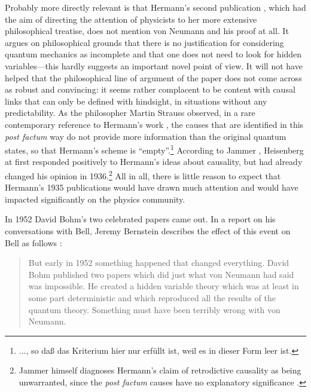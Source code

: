 \documentclass[11pt]{article}
\begin{document}
Probably more directly relevant is that Hermann's second publication \cite{hermann2}, which had the aim of directing the attention of physicists to her more extensive philosophical treatise, does not mention von Neumann and his proof at all. It argues on philosophical grounds that there is no justification for considering quantum mechanics as incomplete and that one does not need to look for hidden variables---this hardly suggests an important novel point of view. It will not have helped that the philosophical line of argument of the paper does not come across as robust and convincing: it seems rather complacent to be content with causal links that can only be defined with hindsight, in situations without any predictability. As the philosopher Martin Strauss observed, in a rare contemporary reference to Hermann's work \cite[p.\@ 338]{strauss}, the causes that are identified in this \emph{post factum} way do not provide more information than the original quantum states, so that Hermann's scheme is ``empty''.\footnote{..., so da{\ss} das Kriterium hier nur erf\"{u}llt ist, weil es in dieser Form leer ist.} According to Jammer \cite[pp.\@ 209--210]{jammer}, Heisenberg at first responded positively to Hermann's ideas about causality, but had already changed his opinion in 1936.\footnote{Jammer himself diagnoses Hermann's claim of retrodictive causality as being unwarranted, since the \emph{post factum} causes have no explanatory significance \cite[p.\@ 209]{jammer}.} All in all, there is little reason to expect that Hermann's 1935 publications would have drawn much attention and would have impacted significantly on the physics community.

In 1952 David Bohm's two celebrated papers came out. In a report on his conversations with Bell, Jeremy Bernstein describes the effect of this event on Bell as follows \cite{bernstein}:
\begin{quote}
But early in 1952 something happened that changed everything. David Bohm published two papers which did just what von Neumann
had said was impossible. He created a hidden variable theory which was at least in some part deterministic and which reproduced all the results of the quantum theory. Something must have been terribly wrong with von Neumann.
\end{quote}
\end{document}
